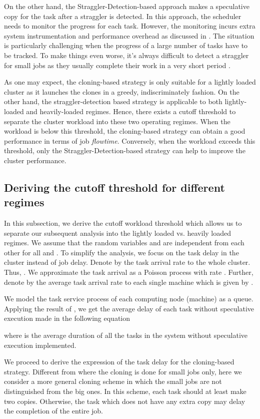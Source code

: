 \documentclass[10pt,conference]{IEEEtran}
\begin{document}
On the other hand, the Straggler-Detection-based approach makes a speculative copy for the task after a straggler is detected. In this approach, the scheduler needs to monitor the progress for each task.  However, the monitoring incurs extra system instrumentation and performance overhead as discussed in {\cite{Monitoring}}. The situation is particularly challenging when the progress of a large number of tasks have to be tracked.  To make things even worse, it's always difficult to detect a straggler for small jobs as they usually complete their work in a very short period {\cite{Cloning}}.

As one may expect, the cloning-based strategy is only suitable for a lightly loaded cluster as it launches the clones in a greedy, indiscriminately fashion. On the other hand,  the straggler-detection based strategy is applicable to both lightly-loaded and heavily-loaded regimes. Hence, there exists a cutoff threshold to separate the cluster workload into these two operating regimes. When the workload is below this threshold, the cloning-based strategy can obtain a good performance in terms of job \textit{flowtime}.  Conversely, when the workload exceeds this threshold, only the Straggler-Detection-based strategy can help to improve the cluster performance.

\subsection{Deriving the cutoff threshold for different regimes}
In this subsection, we derive the cutoff workload threshold  which allows us to separate our subsequent analysis into the lightly loaded vs. heavily loaded regimes.  We assume that the random variables  and  are independent from each other for all  and . To simplify the analysis, we focus on the task delay in the cluster instead of job delay. Denote by  the task arrival rate to the whole cluster. Thus, . We approximate the task arrival as a Poisson process with rate . Further, denote by  the average task arrival rate to each single machine which is given by .

We model the task service process of each computing node (machine) as a  queue. Applying the result of {\cite{queueing_theory}}, we get the average delay of each task without speculative execution made in the following equation

where  is the average duration of all the tasks in the system without speculative execution implemented.

We proceed to derive the expression of the task delay for the cloning-based strategy. Different from {\cite{Cloning}} where the cloning is done for small jobs only, here we consider a more general cloning scheme in which the small jobs are not distinguished from the big ones. In this scheme, each task should at least make two copies. Otherwise, the task which does not have any extra copy may delay the completion of the entire job.
\end{document}
